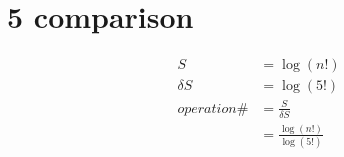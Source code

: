 \documentclass{article}
\begin{document}
\section{5 comparison}
\begin{align*}
S &= \log(n!)\\
\delta S &= \log(5!)\\
operation\#
&= \frac{S}{\delta S}\\
&= \frac{\log(n!)}{\log(5!)}
\end{align*}
\end{document}
